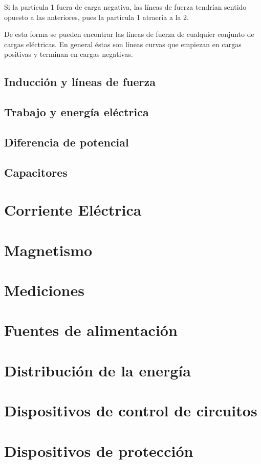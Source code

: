 \documentclass{article}
\begin{document}
Si la partícula 1 fuera de carga negativa, las líneas de fuerza tendrían sentido opuesto a las anteriores, pues la partícula 1 atraería a la 2.

De esta forma se pueden encontrar las líneas de fuerza de cualquier conjunto de cargas eléctricas. En general éstas son líneas curvas que empiezan en cargas positivas y terminan en cargas negativas. 
\pagebreak


	\subsection{Inducción y líneas de fuerza}
	\subsection{Trabajo y energía eléctrica}
	\subsection{Diferencia de potencial}
	\subsection{Capacitores}

\section{Corriente Eléctrica}
\section{Magnetismo}
\section{Mediciones}
\section{Fuentes de alimentación}
\section{Distribución de la energía}
\section{Dispositivos de control de circuitos}
\section{Dispositivos de protección}
\end{document}
